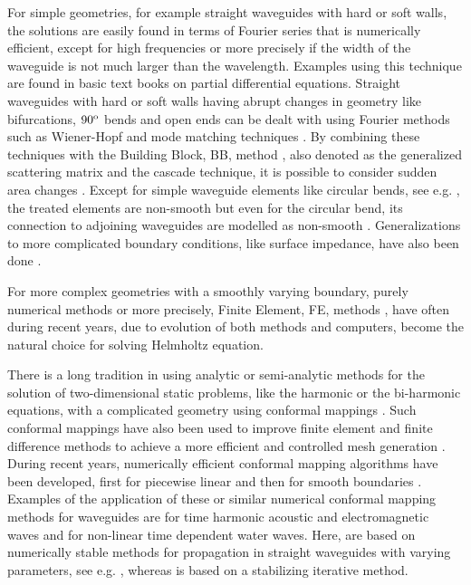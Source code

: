 \documentclass[numreferences]{kluwer}
\begin{document}
For simple geometries, for example straight waveguides with hard or soft
walls, the solutions are easily found in terms of Fourier
series that is numerically efficient, except for high frequencies or more precisely if the width of the waveguide is not much larger than the wavelength. Examples using this technique are found in basic text books on
partial differential equations. Straight waveguides with hard or soft walls having abrupt changes in geometry like bifurcations, $90^{\tiny{\rm o}}$ bends and open ends can be dealt with using Fourier methods such as Wiener-Hopf and mode matching techniques \cite{mittralee1971}. By combining these techniques with the Building Block, BB, method \cite{nilssonbrander1981b}, also denoted as the generalized scattering matrix \cite{mittralee1971} and the cascade \cite{jones1986} technique, it is possible to consider sudden area changes \cite{mittralee1971,nilssonbrander1981b}. Except for simple waveguide elements like circular bends, see e.g. \cite{bironilsson2005}, the treated elements are non-smooth but even for the circular bend, its connection to adjoining waveguides are modelled as non-smooth \cite{bironilsson2005}. Generalizations to more complicated boundary conditions, like surface impedance, have also been done \cite{buyukaksoycinar2005}.

For more complex geometries with a smoothly varying boundary, purely numerical methods or more precisely, Finite Element, FE, methods \cite{zienkiewicz+taylor+zhu:2008,Ihlenburg:1998}, have often during recent years, due to evolution of both methods and computers, become the natural choice for solving Helmholtz equation.

There is a long tradition in using analytic or semi-analytic methods for the solution of two-dimensional static problems, like the harmonic or the bi-harmonic equations, with a complicated geometry using conformal mappings \cite{muskhelishvili:1962}. Such conformal mappings have also been used to improve finite element and finite difference methods to achieve a more efficient and controlled mesh generation \cite{ives+liutermoza:1977}. During recent years, numerically efficient conformal mapping algorithms have been developed, first for piecewise linear \cite{sctoolbox2} and then for smooth boundaries \cite{andersson-outpol:2008,andersson-acf:2009}. Examples of the application of these or similar numerical conformal mapping methods for waveguides are \cite{Andersson:2006,Andersson-Nilsson:2009} for time harmonic acoustic and electromagnetic waves and \cite{nachbin+daSilvaSimoes:2012} for non-linear time dependent water waves. Here, \cite{andersson-outpol:2008,andersson-acf:2009} are based on numerically stable methods for propagation in
straight waveguides with varying parameters, see e.g. \cite{Fishman:1998,Nilsson:2002}, whereas \cite{nachbin+daSilvaSimoes:2012} is based on a stabilizing iterative method.
\end{document}
